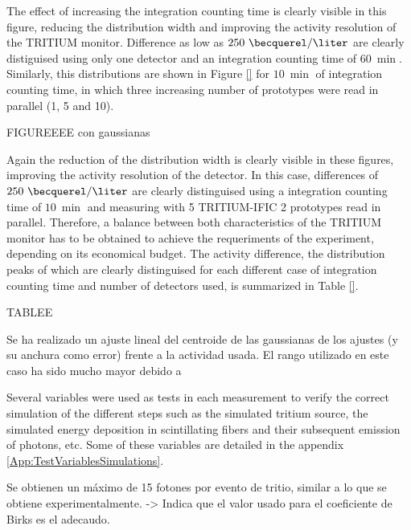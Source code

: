 The effect of increasing the integration counting time is clearly visible in this figure, reducing the distribution width and improving the activity resolution of the TRITIUM monitor. Difference as low as $250~\becquerel/\liter$ are clearly distiguised using only one detector and an integration counting time of $60~\min$. Similarly, this distributions are shown in Figure \ref{} for $10~\min$ of integration counting time, in which three increasing number of prototypes were read in parallel (1, 5 and 10).

FIGUREEEE con gaussianas

Again the reduction of the distribution width is clearly visible in these figures, improving the activity resolution of the detector. In this case, differences of $250~\becquerel/\liter$ are clearly distinguised using a integration counting time of $10~\min$ and measuring with 5 TRITIUM-IFIC 2 prototypes read in parallel. Therefore, a balance between both characteristics of the TRITIUM monitor has to be obtained to achieve the requeriments of the experiment, depending on its economical budget. The activity difference, the distribution peaks of which are clearly distinguised for each different case of integration counting time and number of detectors used, is summarized in Table \ref{}.

TABLEE




 

Se ha realizado un ajuste lineal del centroide de las gaussianas de los ajustes (y su anchura como error) frente a la actividad usada. El rango utilizado en este caso ha sido mucho mayor debido a


Several variables were used as tests in each measurement to verify the correct simulation of the different steps such as the simulated tritium source, the simulated energy deposition in scintillating fibers and their subsequent emission of photons, etc. Some of these variables are detailed in the appendix \ref{App:TestVariablesSimulations}.



Se obtienen un máximo de 15 fotones por evento de tritio, similar a lo que se obtiene experimentalmente. -> Indica que el valor usado para el coeficiente de Birks es el adecaudo.

